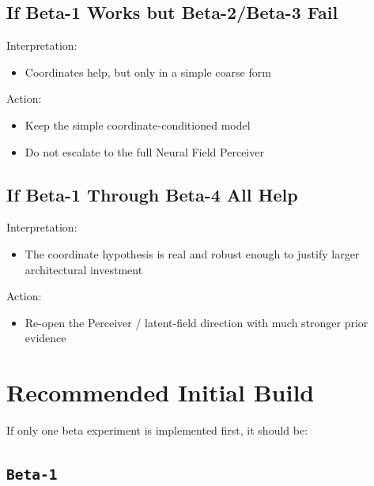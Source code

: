 \documentclass[
]{article}
\providecommand{\tightlist}{%
  \setlength{\itemsep}{0pt}\setlength{\parskip}{0pt}}
\begin{document}
\subsection{If Beta-1 Works but Beta-2/Beta-3
Fail}\label{if-beta-1-works-but-beta-2beta-3-fail}

Interpretation:

\begin{itemize}
\tightlist
\item
  Coordinates help, but only in a simple coarse form
\end{itemize}

Action:

\begin{itemize}
\tightlist
\item
  Keep the simple coordinate-conditioned model
\item
  Do not escalate to the full Neural Field Perceiver
\end{itemize}

\subsection{If Beta-1 Through Beta-4 All
Help}\label{if-beta-1-through-beta-4-all-help}

Interpretation:

\begin{itemize}
\tightlist
\item
  The coordinate hypothesis is real and robust enough to justify larger
  architectural investment
\end{itemize}

Action:

\begin{itemize}
\tightlist
\item
  Re-open the Perceiver / latent-field direction with much stronger
  prior evidence
\end{itemize}

\section{Recommended Initial Build}\label{recommended-initial-build}

If only one beta experiment is implemented first, it should be:

\subsection{\texorpdfstring{\texttt{Beta-1}}{Beta-1}}\label{beta-1}
\end{document}

